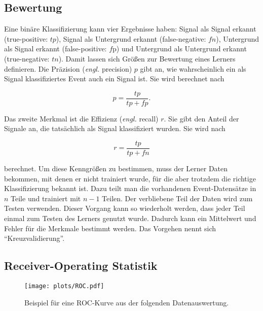 \subsection{Bewertung}
Eine binäre Klassifizierung kann vier Ergebnisse haben: Signal als Signal erkannt (true-positive: $tp$), Signal als Untergrund erkannt (false-negative: $fn$),
Untergrund als Signal erkannt (false-positive: $f$p) und Untergrund als Untergrund erkannt (true-negative: $tn$). Damit lassen sich Größen zur Bewertung eines
Lerners definieren. Die Präzision (\textit{engl.} precision) $p$ gibt an, wie wahrscheinlich ein als Signal klassifiziertes Event auch ein Signal ist. Sie wird berechnet nach

\begin{equation}
	p=\frac{tp}{tp+fp}.
\end{equation}

Das zweite Merkmal ist die Effizienz (\textit{engl.} recall) $r$. Sie gibt den Anteil der Signale an, die tatsächlich als Signal klassifiziert wurden. Sie wird nach

\begin{equation}
	r=\frac{tp}{tp+fn}
\end{equation}

berechnet. Um diese Kenngrößen zu bestimmen, muss der Lerner Daten bekommen, mit denen er nicht trainiert wurde, für die aber trotzdem die richtige Klassifizierung bekannt
ist. Dazu teilt man die vorhandenen Event-Datensätze in $n$ Teile und trainiert mit $n-1$ Teilen. Der verbliebene Teil der Daten wird zum Testen verwenden. Dieser Vorgang
kann so wiederholt werden, dass jeder Teil einmal zum Testen des Lerners genutzt wurde. Dadurch kann ein Mittelwert und Fehler für die Merkmale bestimmt werden. Das Vorgehen nennt sich \enquote{Kreuzvalidierung}.

\subsection{Receiver-Operating Statistik}

\begin{figure}
\centering
\texttt{[image: plots/ROC.pdf]}
\caption{Beispiel für eine ROC-Kurve aus der folgenden Datenauswertung.}
\label{fig:ROC_bsp}
\end{figure}

